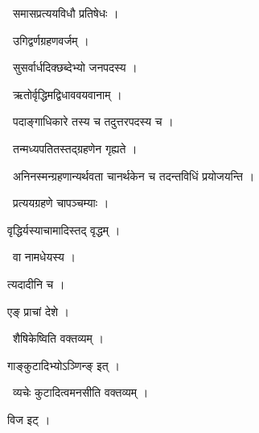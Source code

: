 \documentclass[10pt, openany, oneside]{book}
\begin{document}
\par\noindent\hspace{1.5em}{\vps वा॰}~{\qt समासप्रत्ययविधौ प्रतिषेधः ।}

\par\noindent\hspace{1.5em}{\vps वा॰}~{\qt उगिद्वर्णग्रहणवर्जम् ।}

\par\noindent\hspace{1.5em}{\vps वा॰}~{\qt सुसर्वार्धदिक्छब्देभ्यो जनपदस्य ।}

\par\noindent\hspace{1.5em}{\vps वा॰}~{\qt ऋतोर्वृद्धिमद्विधाववयवानाम् ।}

\par\noindent\hspace{1.5em}{\vps वा॰}~{\qt पदाङ्गाधिकारे तस्य च तदुत्तरपदस्य च ।}

\par\noindent\hspace{1.5em}{\vps वा॰}~{\qt तन्मध्यपतितस्तद्ग्रहणेन गृह्यते ।}

\par\noindent\hspace{1.5em}{\vps वा॰}~{\qt अनिनस्मन्ग्रहणान्यर्थवता चानर्थकेन च तदन्तविधिं प्रयोजयन्ति ।}

\par\noindent\hspace{1.5em}{\vps वा॰}~{\qt प्रत्ययग्रहणे चापञ्चम्याः ।}

\noindent वृद्धिर्यस्याचामादिस्तद् वृद्धम् ।

\par\noindent\hspace{1.5em}{\vps वा॰}~{\qt वा नामधेयस्य ।}

\noindent त्यदादीनि च ।

\noindent एङ् प्राचां देशे ।

\par\noindent\hspace{1.5em}{\vps वा॰}~{\qt शैषिकेष्विति वक्तव्यम् ।}

\noindent गाङ्कुटादिभ्योऽञ्णिन्ङ् इत् ।

\par\noindent\hspace{1.5em}{\vps वा॰}~{\qt व्यचेः कुटादित्वमनसीति वक्तव्यम् ।}

\noindent विज इट् ।
\end{document}
